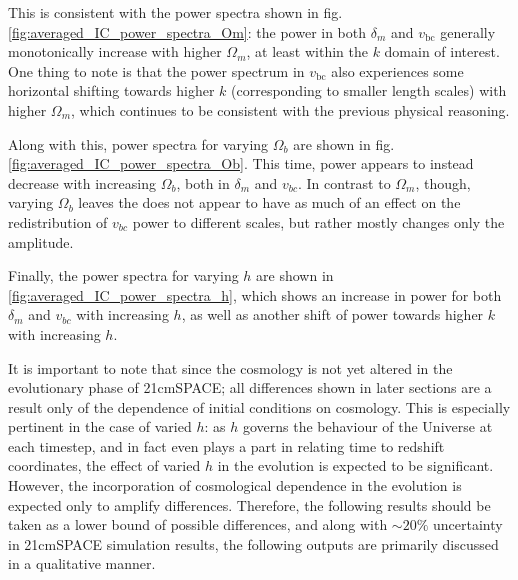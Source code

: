 \documentclass[floats,floatfix,showpacs,amssymb,prd,superscriptaddress,nofootinbib]{revtex4-2} %
\begin{document}
This is consistent with the power spectra shown in fig. \ref{fig:averaged_IC_power_spectra_Om}: the power in both $\delta_m$ and $v_{\text{bc}}$ generally monotonically increase with higher $\Omega_m$, at least within the $k$ domain of interest. One thing to note is that the power spectrum in $v_{\text{bc}}$ also experiences some horizontal shifting towards higher $k$ (corresponding to smaller length scales) with higher $\Omega_m$, which continues to be consistent with the previous physical reasoning.

Along with this, power spectra for varying $\Omega_b$ are shown in fig. \ref{fig:averaged_IC_power_spectra_Ob}. This time, power appears to instead decrease with increasing $\Omega_b$, both in $\delta_m$ and $v_{bc}$. In contrast to $\Omega_m$, though, varying $\Omega_b$ leaves the  does not appear to have as much of an effect on the redistribution of $v_{bc}$ power to different scales, but rather mostly changes only the amplitude.

Finally, the power spectra for varying $h$ are shown in \ref{fig:averaged_IC_power_spectra_h}, which shows an increase in power for both $\delta_m$ and $v_{bc}$ with increasing $h$, as well as another shift of power towards higher $k$ with increasing $h$.

It is important to note that since the cosmology is not yet altered in the evolutionary phase of 21cmSPACE; all differences shown in later sections are a result only of the dependence of initial conditions on cosmology. This is especially pertinent in the case of varied $h$: as $h$ governs the behaviour of the Universe at each timestep, and in fact even plays a part in relating time to redshift coordinates, the effect of varied $h$ in the evolution is expected to be significant. However, the incorporation of cosmological dependence in the evolution is expected only to amplify differences. Therefore, the following results should be taken as a lower bound of possible differences, and along with $\sim 20\%$ uncertainty in 21cmSPACE simulation results, the following outputs are primarily discussed in a qualitative manner.
\end{document}
